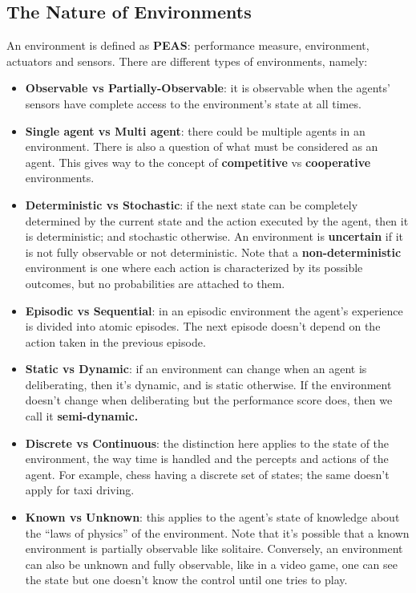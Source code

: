 \documentclass[twoside]{article}
\begin{document}
\subsection{The Nature of Environments}
An environment is defined as \textbf{PEAS}: performance measure, environment,
actuators and sensors. There are different types of environments, namely:
\begin{itemize}
\item \textbf{Observable vs Partially-Observable}: it is observable when the agents'
        sensors have complete access to the environment's state at all times.
\item \textbf{Single agent vs Multi agent}: there could be multiple agents in
        an environment. There is also a question of what must be considered as an
        agent. This gives way to the concept of \textbf{competitive} vs
        \textbf{cooperative} environments.
\item \textbf{Deterministic vs Stochastic}: if the next state can be completely
        determined by the current state and the action executed by the agent,
        then it is deterministic; and stochastic otherwise. An environment
        is \textbf{uncertain} if it is not fully observable or not deterministic.
        Note that a \textbf{non-deterministic} environment is one where each
        action is characterized by its possible outcomes, but no probabilities
        are attached to them.
\item \textbf{Episodic vs Sequential}: in an episodic environment the agent's
        experience is divided into atomic episodes. The next episode doesn't
        depend on the action taken in the previous episode.
\item \textbf{Static vs Dynamic}: if an environment can change when an agent
        is deliberating, then it's dynamic, and is static otherwise. If the
        environment doesn't change when deliberating but the performance score
        does, then we call it \textbf{semi-dynamic.}
\item \textbf{Discrete vs Continuous}: the distinction here applies to the state
        of the environment, the way time is handled and the percepts and actions
        of the agent. For example, chess having a discrete set of states; the
        same doesn't apply for taxi driving.
\item \textbf{Known vs Unknown}: this applies to the agent's state of knowledge
        about the ``laws of physics'' of the environment. Note that it's 
        possible that a known environment is partially observable like solitaire.
        Conversely, an environment can also be unknown and fully observable,
        like in a video game, one can see the state but one doesn't know the
        control until one tries to play.
\end{itemize}
\end{document}
